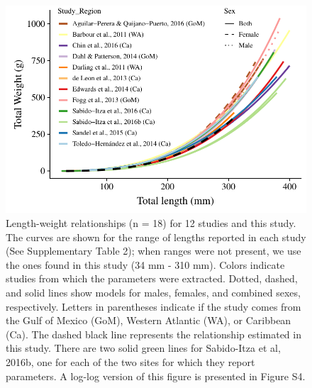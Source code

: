 \documentclass[fleqn,10pt,lineno]{wlpeerj} %
\begin{document}
\begin{figure}
\centering
\includegraphics{Manuscript_files/figure-latex/fit2-1.pdf}
\caption{\label{fig:all_allo}Length-weight relationships (n = 18) for 12
studies and this study. The curves are shown for the range of lengths
reported in each study (See Supplementary Table 2); when ranges were not
present, we use the ones found in this study (34 mm - 310 mm). Colors
indicate studies from which the parameters were extracted. Dotted,
dashed, and solid lines show models for males, females, and combined
sexes, respectively. Letters in parentheses indicate if the study comes
from the Gulf of Mexico (GoM), Western Atlantic (WA), or Caribbean (Ca).
The dashed black line represents the relationship estimated in this
study. There are two solid green lines for Sabido-Itza et al, 2016b, one
for each of the two sites for which they report parameters. A log-log
version of this figure is presented in Figure S4.}
\end{figure}
\end{document}
